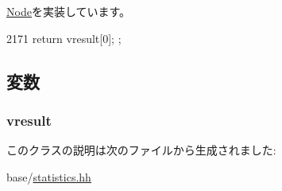 \hyperlink{classStats_1_1Node_ab152b7e89b37a7db03b04d500ceb8349}{Node}を実装しています。


\begin{DoxyCode}
2171 { return vresult[0]; };
\end{DoxyCode}


\subsection{変数}
\hypertarget{classStats_1_1ConstNode_a8f41af856442757ec68f3391333d3eb2}{
\subsubsection[{vresult}]{ {\bf vresult}}}
\label{classStats_1_1ConstNode_a8f41af856442757ec68f3391333d3eb2}


このクラスの説明は次のファイルから生成されました:\begin{DoxyCompactItemize}
\item 
base/\hyperlink{statistics_8hh}{statistics.hh}\end{DoxyCompactItemize}
